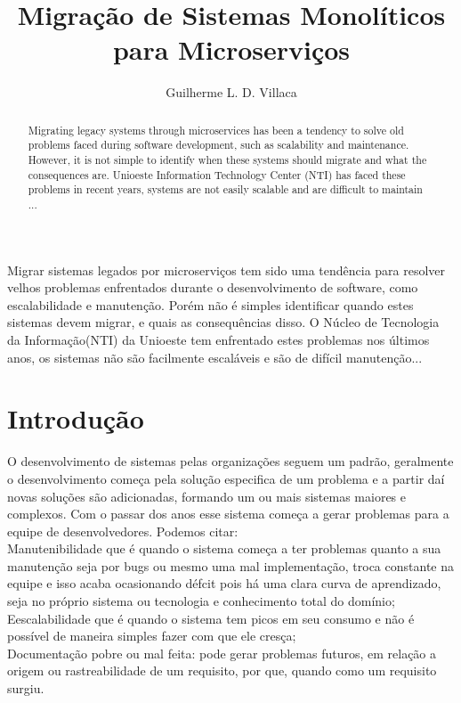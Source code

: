 \documentclass[12pt]{article}
\title{Migração de Sistemas Monolíticos para Microserviços}
\author{Guilherme L. D. Villaca\inst{1}}
\begin{document}
 

\maketitle

\begin{abstract}
Migrating legacy systems through microservices has been a tendency to solve old problems faced during software development, such as scalability and maintenance. However, it is not simple to identify when these systems should migrate and what the consequences are. Unioeste Information Technology Center (NTI) has faced these problems in recent years, systems are not easily scalable and are difficult to maintain ...
\end{abstract}
     
\begin{resumo} 
Migrar sistemas legados por microserviços tem sido uma tendência para resolver velhos problemas enfrentados durante o desenvolvimento de software, como escalabilidade e manutenção. Porém não é simples identificar quando estes sistemas devem migrar, e quais as consequências disso. O Núcleo de Tecnologia da Informação(NTI) da Unioeste tem enfrentado estes problemas nos últimos anos, os sistemas não são facilmente escaláveis e são de difícil manutenção...
\end{resumo}


\section{Introdução}

O desenvolvimento de sistemas pelas organizações seguem um padrão, geralmente o desenvolvimento começa pela solução especifica de um problema e a partir daí novas soluções são adicionadas, formando um ou mais sistemas maiores e complexos. Com o passar dos anos esse sistema começa a gerar problemas para a equipe de desenvolvedores. Podemos citar: 
\\Manutenibilidade que é quando o sistema começa a ter problemas quanto a sua manutenção seja por bugs ou mesmo uma mal implementação, troca constante na equipe e isso acaba ocasionando défcit pois há uma clara curva de aprendizado, seja no próprio sistema ou tecnologia e conhecimento total do domínio;
\\Eescalabilidade que é quando o sistema tem picos em seu consumo e não é possível de maneira simples fazer com que ele cresça;
\\Documentação pobre ou mal feita: pode gerar problemas futuros, em relação a origem ou rastreabilidade de um requisito, por que, quando como um requisito surgiu.
\end{document}
